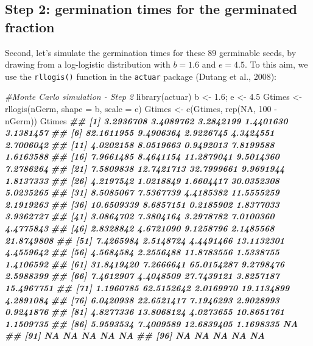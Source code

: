 \documentclass[
]{book}
\newenvironment{Shaded}{\begin{snugshade}}{\end{snugshade}}
\newcommand{\AttributeTok}[1]{\textcolor[rgb]{0.77,0.63,0.00}{#1}}
\newcommand{\CommentTok}[1]{\textcolor[rgb]{0.56,0.35,0.01}{\textit{#1}}}
\newcommand{\ConstantTok}[1]{\textcolor[rgb]{0.00,0.00,0.00}{#1}}
\newcommand{\DecValTok}[1]{\textcolor[rgb]{0.00,0.00,0.81}{#1}}
\newcommand{\DocumentationTok}[1]{\textcolor[rgb]{0.56,0.35,0.01}{\textbf{\textit{#1}}}}
\newcommand{\FloatTok}[1]{\textcolor[rgb]{0.00,0.00,0.81}{#1}}
\newcommand{\FunctionTok}[1]{\textcolor[rgb]{0.00,0.00,0.00}{#1}}
\newcommand{\NormalTok}[1]{#1}
\newcommand{\OtherTok}[1]{\textcolor[rgb]{0.56,0.35,0.01}{#1}}
\newcommand{\SpecialCharTok}[1]{\textcolor[rgb]{0.00,0.00,0.00}{#1}}
\begin{document}
\hypertarget{step-2-germination-times-for-the-germinated-fraction}{%
\subsection{Step 2: germination times for the germinated fraction}\label{step-2-germination-times-for-the-germinated-fraction}}

Second, let's simulate the germination times for these 89 germinable seeds, by drawing from a log-logistic distribution with \(b = 1.6\) and \(e = 4.5\). To this aim, we use the \texttt{rllogis()} function in the \texttt{actuar} package (Dutang et al., 2008):

\begin{Shaded}
\begin{Highlighting}[]
\CommentTok{\#Monte Carlo simulation {-} Step 2}
\FunctionTok{library}\NormalTok{(actuar)}
\NormalTok{b }\OtherTok{\textless{}{-}} \FloatTok{1.6}\NormalTok{; e }\OtherTok{\textless{}{-}} \FloatTok{4.5} 
\NormalTok{Gtimes }\OtherTok{\textless{}{-}} \FunctionTok{rllogis}\NormalTok{(nGerm, }\AttributeTok{shape =}\NormalTok{ b, }\AttributeTok{scale =}\NormalTok{ e)}
\NormalTok{Gtimes }\OtherTok{\textless{}{-}} \FunctionTok{c}\NormalTok{(Gtimes, }\FunctionTok{rep}\NormalTok{(}\ConstantTok{NA}\NormalTok{, }\DecValTok{100} \SpecialCharTok{{-}}\NormalTok{ nGerm))}
\NormalTok{Gtimes}
\DocumentationTok{\#\#   [1]  3.2936708  3.4089762  3.2842199  1.4401630  3.1381457}
\DocumentationTok{\#\#   [6] 82.1611955  9.4906364  2.9226745  4.3424551  2.7006042}
\DocumentationTok{\#\#  [11]  4.0202158  8.0519663  0.9492013  7.8199588  1.6163588}
\DocumentationTok{\#\#  [16]  7.9661485  8.4641154 11.2879041  9.5014360  7.2786264}
\DocumentationTok{\#\#  [21]  7.5809838 12.7421713 32.7999661  9.9691944  1.8137333}
\DocumentationTok{\#\#  [26]  4.2197542  1.0218849  1.6604417 30.0352308  5.0235265}
\DocumentationTok{\#\#  [31]  8.5085067  7.5367739  4.4185382 11.5555259  2.1919263}
\DocumentationTok{\#\#  [36] 10.6509339  8.6857151  0.2185902  1.8377033  3.9362727}
\DocumentationTok{\#\#  [41]  3.0864702  7.3804164  3.2978782  7.0100360  4.4775843}
\DocumentationTok{\#\#  [46]  2.8328842  4.6721090  9.1258796  2.1485568 21.8749808}
\DocumentationTok{\#\#  [51]  7.4265984  2.5148724  4.4491466 13.1132301  4.4559642}
\DocumentationTok{\#\#  [56]  4.5684584  2.2556488 11.8783556  1.5338755  1.4106592}
\DocumentationTok{\#\#  [61] 31.8419420  7.2666641 65.0154287  9.2798476  2.5988399}
\DocumentationTok{\#\#  [66]  7.4612907  4.4048509 27.7439121  3.8257187 15.4967751}
\DocumentationTok{\#\#  [71]  1.1960785 62.5152642  2.0169970 19.1134899  4.2891084}
\DocumentationTok{\#\#  [76]  6.0420938 22.6521417  7.1946293  2.9028993  0.9241876}
\DocumentationTok{\#\#  [81]  4.8277336 13.8068124  4.0273655 10.8651761  1.1509735}
\DocumentationTok{\#\#  [86]  5.9593534  7.4009589 12.6839405  1.1698335         NA}
\DocumentationTok{\#\#  [91]         NA         NA         NA         NA         NA}
\DocumentationTok{\#\#  [96]         NA         NA         NA         NA         NA}
\end{Highlighting}
\end{Shaded}
\end{document}
